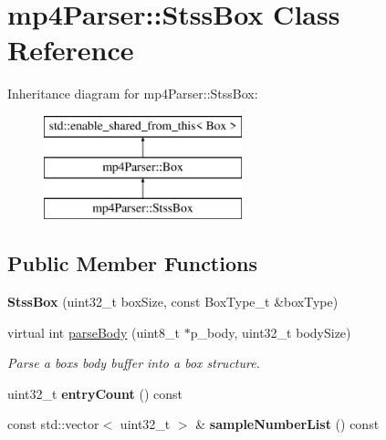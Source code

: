 \hypertarget{classmp4_parser_1_1_stss_box}{}\section{mp4\+Parser\+::Stss\+Box Class Reference}
\label{classmp4_parser_1_1_stss_box}
Inheritance diagram for mp4\+Parser\+::Stss\+Box\+:\begin{figure}[H]
\begin{center}
\leavevmode
\includegraphics[height=3.000000cm]{classmp4_parser_1_1_stss_box}
\end{center}
\end{figure}
\subsection*{Public Member Functions}
\begin{DoxyCompactItemize}
\item 
\mbox{\label{classmp4_parser_1_1_stss_box_ae0386cf0ef1604bf4ecdc0075c637fa6}} 
{\bfseries Stss\+Box} (uint32\+\_\+t box\+Size, const Box\+Type\+\_\+t \&box\+Type)
\item 
virtual int \mbox{\hyperlink{classmp4_parser_1_1_stss_box_a1d6de5d79b6d67ffc2ae30dd6c1f9b67}{parse\+Body}} (uint8\+\_\+t $\ast$p\+\_\+body, uint32\+\_\+t body\+Size)
\begin{DoxyCompactList}\small\item\em Parse a box\textquotesingle{}s body buffer into a box structure. \end{DoxyCompactList}\item 
\mbox{\label{classmp4_parser_1_1_stss_box_ad2ffa2ad2da1b058ff94d2035c8e007f}} 
uint32\+\_\+t {\bfseries entry\+Count} () const
\item 
\mbox{\label{classmp4_parser_1_1_stss_box_a38321a05aa1bcadcd76f9c3745639347}} 
const std\+::vector$<$ uint32\+\_\+t $>$ \& {\bfseries sample\+Number\+List} () const
\end{DoxyCompactItemize}

